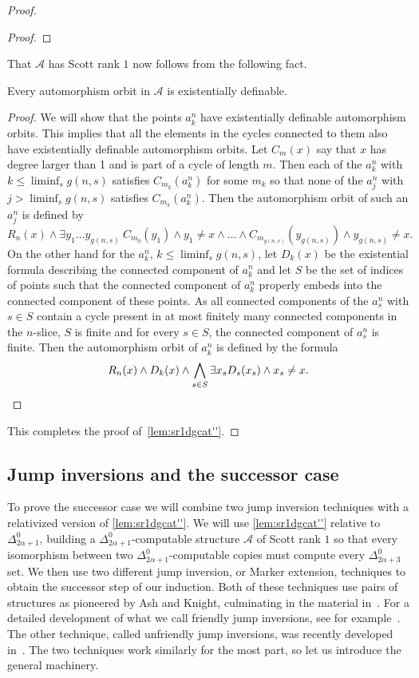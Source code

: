 \documentclass{amsart}
\newcommand\+[1]{\mathcal{#1}}
\renewcommand\*[1]{\mathbf{#1}}
\renewcommand\=[1]{\text{#1}}
\renewcommand\*[1]{\mathbf{#1}}
\newcommand{\A}{\mathcal{A}}
\begin{document}
\begin{proof}
\begin{proof}
 \end{proof}
 That $\A$ has Scott rank $1$ now follows from the following fact.
 \begin{claim}
   Every automorphism orbit in $\A$ is existentially definable.
 \end{claim}
 \begin{proof}
   We will show that the points $a_k^n$ have existentially definable automorphism orbits. This implies that all the elements in the cycles connected to them also have existentially definable automorphism orbits. Let $C_m(x)$ say that $x$ has degree larger than 1 and is part of a cycle of length $m$. Then each of the $a_k^n$ with $k\leq \liminf_s g(n,s)$ satisfies $C_{m_k}(a_k^n)$ for some $m_k$ so that none of the $a_j^n$ with $j>\liminf_s g(n,s)$ satisfies $C_{m_k}(a_k^n)$. Then the automorphism orbit of such an $a_j^n$ is defined by 
   \[ R_n(x)\land \exists y_1\dots y_{g(n,s)} \ C_{m_0}(y_1)\land y_1\neq x\land \dots \land C_{m_{g(n,s)}}(y_{g(n,s)}) \land y_{g(n,s)}\neq x. \]
   On the other hand for the $a_k^n$, $k\leq \liminf_s g(n,s)$, let $D_k(x)$ be the existential formula describing the connected component of $a_k^n$ and let $S$ be the set of indices of points such that the connected component of $a_k^n$ properly embeds into the connected component of these points. 
As all connected components of the $a_s^n$ with $s\in S$ contain a cycle present in at most finitely many connected components in the $n$-slice, $S$ is finite and for every $s\in S$, the connected component of $a_s^n$ is finite. 
    Then the automorphism orbit of $a_k^n$ is defined by the formula
   \[ R_n(x)\land D_k(x) \land \bigwedge_{s\in S} \exists x_s D_s(x_s) \land x_s\neq x.\qedhere\]
 \end{proof}
 This completes the proof of~\cref{lem:sr1dgcat''}.
 \end{proof}
\subsection{Jump inversions and the successor case}
To prove the successor case we will combine two jump inversion techniques with a relativized version of \cref{lem:sr1dgcat''}. We will use \cref{lem:sr1dgcat''} relative to $\Delta^0_{2\alpha+1}$, building a $\Delta^0_{2\alpha+1}$-computable structure $\+A$ of Scott rank $1$ so that every isomorphism between two $\Delta^0_{2\alpha+1}$-computable copies must compute every $\Delta^0_{2\alpha+3}$ set. We then use two different jump inversion, or Marker extension, techniques to obtain the successor step of our induction. Both of these techniques use pairs of structures as pioneered by Ash and Knight, culminating in the material in~\cite{ash2000}. For a detailed development of what we call friendly jump inversions, see for example~\cite[Chapter X.3]{montalban2025}. The other technique, called unfriendly jump inversions, was recently developed in~\cite{harrison-trainor2025}. The two techniques work similarly for the most part, so let us introduce the general machinery.
\end{document}
